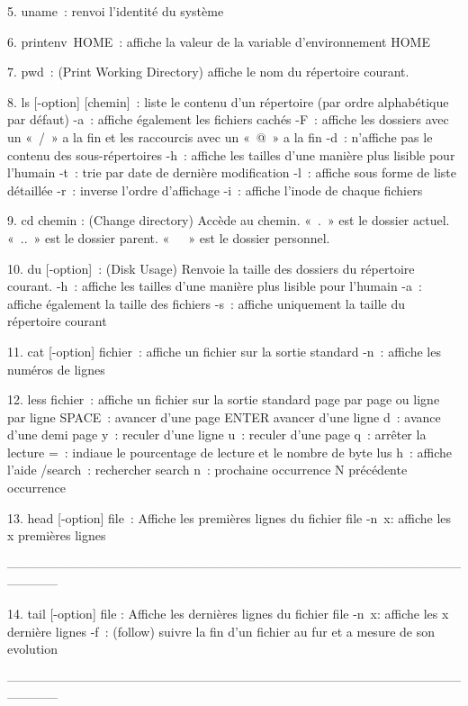 \documentclass[a4paper, 10pt, onecolumn, openright, oneside]{book}
\begin{document}
    5. uname : renvoi l’identité du système

    6. printenv HOME :  affiche la valeur de la variable d'environnement HOME

    7. pwd : (Print Working Directory) affiche le nom du répertoire courant. 

    8. ls [-option] [chemin] : liste le contenu d'un répertoire (par ordre alphabétique par défaut)
-a : affiche également les fichiers cachés
-F : affiche les dossiers avec un « / » a la fin et les raccourcis avec un « @ » a la fin
-d : n'affiche pas le contenu des sous-répertoires
-h : affiche les tailles d’une manière plus lisible pour l’humain
-t : trie par date de dernière modification
-l : affiche sous forme de liste détaillée
-r : inverse l'ordre d'affichage
-i : affiche l’inode de chaque fichiers

    9. cd chemin : (Change directory) Accède au chemin. « . » est le dossier actuel. « .. » est le dossier parent. « ~ » est le dossier personnel.

    10. du  [-option] : (Disk Usage) Renvoie la taille des dossiers du répertoire courant.
-h : affiche les tailles d’une manière plus lisible pour l’humain
-a : affiche également la taille des fichiers
-s : affiche uniquement la taille du répertoire courant

    11. cat [-option] fichier : affiche un fichier sur la sortie standard
-n : affiche les numéros de lignes

    12. less fichier : affiche un fichier sur la sortie standard page par page ou ligne par ligne
SPACE : avancer d’une page
ENTER avancer d’une ligne
d : avance d’une demi page
y : reculer d’une ligne
u : reculer d’une page
q : arrêter la lecture
= : indiaue le pourcentage de lecture et le nombre de byte lus
h : affiche l’aide
/search : rechercher search
n : prochaine occurrence 
N précédente occurrence

    13. head [-option] file : Affiche les premières lignes du fichier file
-n x: affiche les x premières lignes

------------------------------------------------------------------------------------------------------------------------

    14. tail [-option] file : Affiche les dernières lignes du fichier file
-n x: affiche les x dernière lignes
-f : (follow) suivre la fin d’un fichier au fur et a mesure de son evolution

------------------------------------------------------------------------------------------------------------------------
\end{document}
